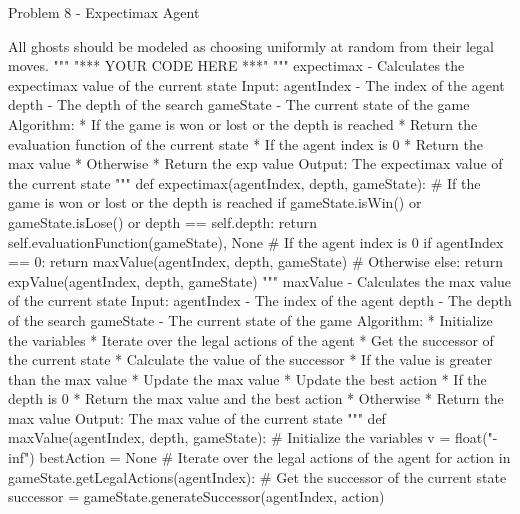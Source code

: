 \begin{problem}{Problem 8 - Expectimax Agent}
\begin{highlight}[Solution]
\begin{code}[Python]
            All ghosts should be modeled as choosing uniformly at random from their
            legal moves.
        """
        "*** YOUR CODE HERE ***"
        """ expectimax - Calculates the expectimax value of the current state
                Input:
                agentIndex - The index of the agent
                depth - The depth of the search
                gameState - The current state of the game
                Algorithm:
                * If the game is won or lost or the depth is reached
                    * Return the evaluation function of the current state
                * If the agent index is 0
                    * Return the max value
                * Otherwise
                    * Return the exp value
                Output:
                The expectimax value of the current state
        """
        def expectimax(agentIndex, depth, gameState):
            # If the game is won or lost or the depth is reached
            if gameState.isWin() or gameState.isLose() or depth == self.depth:
                return self.evaluationFunction(gameState), None
            # If the agent index is 0
            if agentIndex == 0:
                return maxValue(agentIndex, depth, gameState)
            # Otherwise
            else:
                return expValue(agentIndex, depth, gameState)
        """ maxValue - Calculates the max value of the current state
                Input:
                agentIndex - The index of the agent
                depth - The depth of the search
                gameState - The current state of the game
                Algorithm:
                * Initialize the variables
                * Iterate over the legal actions of the agent
                    * Get the successor of the current state
                    * Calculate the value of the successor
                    * If the value is greater than the max value
                    * Update the max value
                    * Update the best action
                * If the depth is 0
                    * Return the max value and the best action
                * Otherwise
                    * Return the max value
                Output:
                The max value of the current state
        """
        def maxValue(agentIndex, depth, gameState):
            # Initialize the variables
            v = float("-inf")
            bestAction = None
            # Iterate over the legal actions of the agent
            for action in gameState.getLegalActions(agentIndex):
                # Get the successor of the current state
                successor = gameState.generateSuccessor(agentIndex, action)

\end{code}
\end{highlight}
\end{problem}
